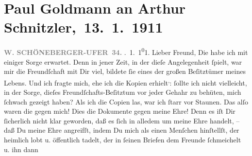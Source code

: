                \section[ Paul Goldmann an Arthur Schnitzler, 13. 1. 1911]{ Paul Goldmann an Arthur Schnitzler, 13. 1. 1911}\nopagebreak{}\rehead{ }\begin{ledgroupsized}[t]{13cm}\normalsize\beginnumbering{} \toendnotes[C]{\smallbreak\pagebreak[2]} 
\toendnotes[C]{\smallbreak}\pstart
           \noindent{}\raggedleft{}{\pb}\textcolor{gray}{\textbf{W. SCHÖNEBERGER-UFER 34.}}\pend
           . 1. 1\substVorne{}\textsuperscript{0}\substDazwischen{}1\substHinten{}.\pend
           \pstart\center{}Lieber Freund,\pend\pstart
           Die \label{K_L03475-1v}\label{K_L03475-1h} habe ich mit einiger Sorge erwartet. Denn in jener Zeit, in der dieſe
               Angelegenheit ſpielt, war mir die Freundſchaft mit Dir  viel, bildete ſie eines der großen Beſitztümer meines Lebens. Und ich
               fragte mich, ehe ich die Kopien erhielt\substVorne{}\textsuperscript{,}\substDazwischen{}:\substHinten{} ſollte ich nicht vielleicht, in der Sorge, dieſes Freundſchafts-Beſitztum
               vor jeder Gehahr zu behüten, mich ſchwach gezeigt haben?\pend
           \pstart
           Als ich die Copien las, war ich ſtarr vor Staunen. Das alſo waren {\pb}die \label{K_L03475-2v}\label{K_L03475-2h} gegen mich! Dies die Dokumente gegen meine Ehre! Denn es iſt Dir ſicherlich
               nicht klar geworden, daß es ſich in alledem um meine Ehre handelt, – daß Du meine
               Ehre angreifſt, indem Du mich als einen Menſchen hinſtellſt, der heimlich lobt u.
               öffentlich tadelt, der in ſeinen Briefen dem Freunde ſchmeichelt u. ihn dann

\end{ledgroupsized}
